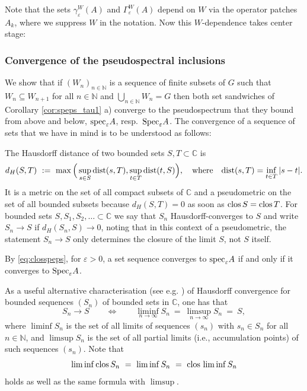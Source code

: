 \documentclass{article}
\newcommand{\bl}[1]{\textcolor{blue}{#1}}   %
\newcommand\C{{\mathbb C}}
\newcommand\N{{\mathbb N}}
\newcommand\eps{{\varepsilon}}
\newcommand\speps{{\rm spec}_\eps}
\newcommand\Speps{{\rm Spec}_\eps}
\newcommand\dist{{\rm dist}}
\newcommand\clos{{\rm clos\,}}
\numberwithin{equation}{section}   %
\numberwithin{figure}{section}  %
\begin{document}
Note that the sets $\gamma_{\eps}^W(A)$ and $\Gamma_{\eps}^W(A)$ depend on $W$ via the operator patches $A_k$, where we suppress $W$ in the notation. Now this $W$-dependence takes center stage:

\subsubsection{Convergence of the pseudospectral inclusions}
We show that if 
$(W_n)_{n\in\N}$ is a sequence of finite subsets of $G$ such that $W_n\subseteq W_{n+1}$ for all $n\in\N$ and $\bigcup_{n\in\N} W_n = G$
then both set sandwiches of Corollary \ref{cor:speps_tau1} a) converge to the pseudospectrum that they bound from above and below, $\speps A$, resp.~$\Speps A$. The convergence of a sequence of sets that we have in mind is to be understood as follows:

The Hausdorff distance of two bounded sets $S,T\subset\C$ is
\[
d_H(S,T)\ :=\ \max\Big(\sup_{s\in S}\dist(s,T),\sup_{t\in T}\dist(t,S) \Big),
\quad\text{where}\quad
\dist(s,T)=\inf_{t\in T}|s-t|.
\]
It is a metric on the set of all compact subsets of $\C$ and a pseudometric on the set of all bounded subsets because $d_H(S,T)=0$ as soon as $\clos S=\clos T$. For bounded sets $S,S_1,S_2,\dots\subset\C$ we say that $S_n$ Hausdorff-converges to $S$ and write $S_n\to S$ if $d_H(S_n,S)\to 0$, noting that in this context of a pseudometric, the statement $S_n\to S$ only determines the closure of the limit $S$, not $S$ itself.

By \eqref{eq:closspeps}, for $\eps>0$, a set sequence converges to $\speps A$ if and only if it converges to $\Speps A$.

As a useful alternative characterisation (see e.g. \cite[Prop.~3.6]{HaRoSi2}) of Hausdorff convergence for bounded sequences $(S_n)$ of bounded sets in $\C$, one has that
\begin{equation} \label{eq:Haus_liminf_limsup}
S_n\to S\qquad\iff\qquad
\liminf_{n\to\infty} S_n\ =\ \limsup_{n\to\infty}S_n\ =\ S,
\end{equation}
where $\liminf S_n$ is the set of all limits of sequences $(s_n)$ with $s_n\in S_n$ for all $n\in\N$, and $\limsup S_n$ is the set of all partial limits (i.e., accumulation points) of such sequences $(s_n)$. 
Note that 
\begin{equation} \label{eq:liminf_clos}
\liminf \clos S_n\ =\ \liminf S_n\ =\ \clos\liminf S_n
\end{equation}
holds as well as the same formula with $\limsup$.
\end{document}
